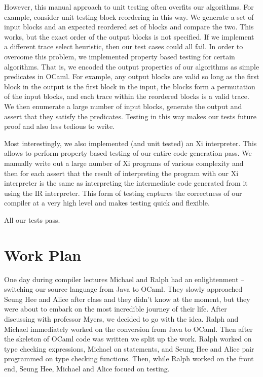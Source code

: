 \documentclass{hw}
\begin{document}
However, this manual approach to unit testing often overfits our algorithms.
For example, consider unit testing block reordering in this way. We generate a
set of input blocks and an expected reordered set of blocks and compare the
two. This works, but the exact order of the output blocks is not specified. If
we implement a different trace select heuristic, then our test cases could all
fail. In order to overcome this problem, we implemented property based testing
for certain algorithms. That is, we encoded the output properties of our
algorithms as simple predicates in OCaml. For example, any output blocks are
valid so long as the first block in the output is the first block in the input,
the blocks form a permutation of the input blocks, and each trace within the
reordered blocks is a valid trace. We then enumerate a large number of input
blocks, generate the output and assert that they satisfy the predicates.
Testing in this way makes our tests future proof and also less tedious to
write.

Most interestingly, we also implemented (and unit tested) an Xi interpreter.
This allows to perform property based testing of our entire code generation
pass. We manually write out a large number of Xi programs of various complexity
and then for each assert that the result of interpreting the program with our
Xi interpreter is the same as interpreting the intermediate code generated from
it using the IR interpreter. This form of testing captures the correctness of
our compiler at a very high level and makes testing quick and flexible.

All our tests pass.

\section{Work Plan}\label{sec:workplan}
One day during compiler lectures Michael and Ralph had an enlightenment -- switching our
source language from Java to OCaml.
They slowly approached Seung Hee and Alice after class and they didn't know at the moment,
but they were about to embark on the most incredible journey of their life. After discussing
with professor Myers, we decided to go with the idea. Ralph and Michael immediately
worked on the conversion from Java to OCaml. Then after the skeleton of OCaml code was written
we split up the work. Ralph worked on type checking expressions, Michael on statements,
and Seung Hee and Alice pair programmed on type checking functions. Then, while
Ralph worked on the front end, Seung Hee, Michael and Alice focued on testing.
\end{document}
